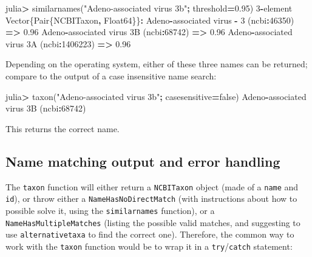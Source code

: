 \documentclass[10pt,oneside]{article}
\newenvironment{Shaded}{\begin{snugshade}}{\end{snugshade}}
\newcommand{\DataTypeTok}[1]{\textcolor[rgb]{0.13,0.29,0.53}{#1}}
\newcommand{\FloatTok}[1]{\textcolor[rgb]{0.00,0.00,0.81}{#1}}
\newcommand{\StringTok}[1]{\textcolor[rgb]{0.31,0.60,0.02}{#1}}
\newcommand{\OperatorTok}[1]{\textcolor[rgb]{0.81,0.36,0.00}{\textbf{#1}}}
\newcommand{\ExtensionTok}[1]{#1}
\newcommand{\NormalTok}[1]{#1}
\begin{document}
\begin{Shaded}
\begin{Highlighting}[]
\NormalTok{julia}\OperatorTok{\textgreater{}}\NormalTok{ similarnames(}\StringTok{"Adeno{-}associated virus 3b"}\OperatorTok{;}\NormalTok{ threshold}\OperatorTok{=}\FloatTok{0.95}\NormalTok{)}
\FloatTok{3}\OperatorTok{{-}}\NormalTok{element }\DataTypeTok{Vector}\NormalTok{\{}\DataTypeTok{Pair}\NormalTok{\{NCBITaxon}\OperatorTok{,} \DataTypeTok{Float64}\NormalTok{\}\}}\OperatorTok{:}
\NormalTok{  Adeno}\OperatorTok{{-}}\NormalTok{associated virus }\OperatorTok{{-}} \FloatTok{3}\NormalTok{ (ncbi}\OperatorTok{:}\FloatTok{46350}\NormalTok{) }\OperatorTok{=\textgreater{}} \FloatTok{0.96}
\NormalTok{   Adeno}\OperatorTok{{-}}\NormalTok{associated virus }\FloatTok{3}\NormalTok{B (ncbi}\OperatorTok{:}\FloatTok{68742}\NormalTok{) }\OperatorTok{=\textgreater{}} \FloatTok{0.96}
\NormalTok{ Adeno}\OperatorTok{{-}}\NormalTok{associated virus }\FloatTok{3}\NormalTok{A (ncbi}\OperatorTok{:}\FloatTok{1406223}\NormalTok{) }\OperatorTok{=\textgreater{}} \FloatTok{0.96}
\end{Highlighting}
\end{Shaded}

Depending on the operating system, either of these three names can be
returned; compare to the output of a case insensitive name search:

\begin{Shaded}
\begin{Highlighting}[]
\NormalTok{julia}\OperatorTok{\textgreater{}}\NormalTok{ taxon(}\StringTok{"Adeno{-}associated virus 3b"}\OperatorTok{;}\NormalTok{ casesensitive}\OperatorTok{=}\ExtensionTok{false}\NormalTok{)}
\NormalTok{Adeno}\OperatorTok{{-}}\NormalTok{associated virus }\FloatTok{3}\NormalTok{B (ncbi}\OperatorTok{:}\FloatTok{68742}\NormalTok{)}
\end{Highlighting}
\end{Shaded}

This returns the correct name.

\hypertarget{name-matching-output-and-error-handling}{%
\subsection{Name matching output and error
handling}\label{name-matching-output-and-error-handling}}

The \texttt{taxon} function will either return a \texttt{NCBITaxon}
object (made of a \texttt{name} and \texttt{id}), or throw either a
\texttt{NameHasNoDirectMatch} (with instructions about how to possible
solve it, using the \texttt{similarnames} function), or a
\texttt{NameHasMultipleMatches} (listing the possible valid matches, and
suggesting to use \texttt{alternativetaxa} to find the correct one).
Therefore, the common way to work with the \texttt{taxon} function would
be to wrap it in a \texttt{try}/\texttt{catch} statement:
\end{document}
